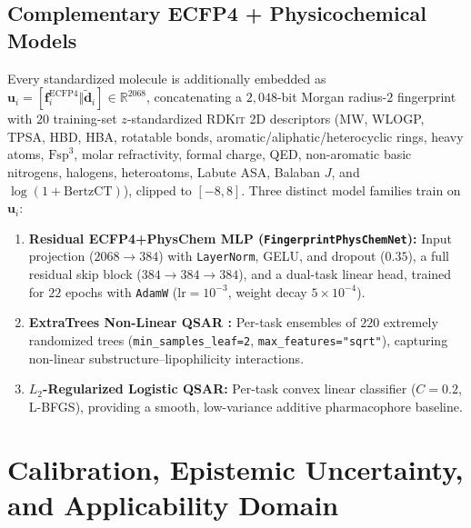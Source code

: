 \documentclass[10pt,twocolumn,letterpaper]{article}
\begin{document}
\subsection{Complementary ECFP4 + Physicochemical Models}
Every standardized molecule is additionally embedded as $\mathbf{u}_i = [\mathbf{f}_i^{\mathrm{ECFP4}} \Vert \tilde{\mathbf{d}}_i] \in \mathbb{R}^{2068}$, concatenating a $2{,}048$-bit Morgan radius-$2$ fingerprint \citep{rogers2010extended} with $20$ training-set $z$-standardized \textsc{RDKit} 2D descriptors (MW, WLOGP, TPSA, HBD, HBA, rotatable bonds, aromatic/aliphatic/heterocyclic rings, heavy atoms, $\mathrm{Fsp}^3$, molar refractivity, formal charge, QED, non-aromatic basic nitrogens, halogens, heteroatoms, Labute ASA, Balaban $J$, and $\log(1+\mathrm{BertzCT})$), clipped to $[-8, 8]$. Three distinct model families train on $\mathbf{u}_i$:
\begin{enumerate}
  \item \textbf{Residual \textsc{ECFP4}+PhysChem \textsc{MLP} (\texttt{FingerprintPhysChemNet}):} Input projection ($2068 \to 384$) with \texttt{LayerNorm}, \textsc{GELU}, and dropout ($0.35$), a full residual skip block ($384 \to 384 \to 384$), and a dual-task linear head, trained for $22$ epochs with \texttt{AdamW} ($\mathrm{lr}=10^{-3}$, weight decay $5\times 10^{-4}$).
  \item \textbf{ExtraTrees Non-Linear \textsc{QSAR} \citep{geurts2006extremely}:} Per-task ensembles of $220$ extremely randomized trees (\texttt{min\_samples\_leaf=2}, \texttt{max\_features="sqrt"}), capturing non-linear substructure–lipophilicity interactions.
  \item \textbf{$L_2$-Regularized Logistic \textsc{QSAR}:} Per-task convex linear classifier ($C = 0.2$, \textsc{L-BFGS}), providing a smooth, low-variance additive pharmacophore baseline.
\end{enumerate}

\section{Calibration, Epistemic Uncertainty, and Applicability Domain}
\end{document}
